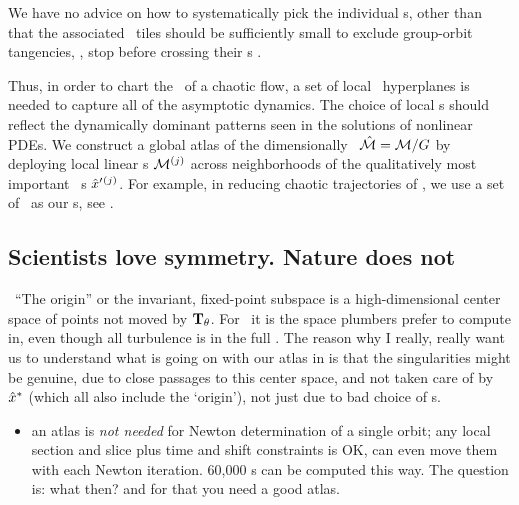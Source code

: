 We have no advice on how to
systematically pick the individual \template s, other than that the
associated \slice\ tiles should be sufficiently small to exclude
group-orbit tangencies, \ie, stop before crossing their {\chartBord}s .

Thus, in order to chart the \statesp\ of a chaotic flow, a set
of local \slice\ hyperplanes is needed to capture all of the asymptotic
dynamics. The choice of local \slice s should reflect the dynamically
dominant patterns seen in the solutions of nonlinear PDEs. We construct a
global atlas of the dimensionally \reducedsp\ $\hat{\cal M} = {\cal M}/G$ by
deploying local linear \slice s  ${\cal M}{}^{(j)}$ across neighborhoods of
the qualitatively most important \template\ {\cohStr s}
${\hat{x}'}{}^{(j)}$. For example, in reducing chaotic trajectories of
, we use a set of \reqva\ as our \template s, see
.

    \ifdraft\color{blue}
\subsection{Scientists love symmetry. Nature does not}\
``The origin'' or the invariant, fixed-point subspace is a
high-dimensional center space of points not moved by $\mathbf{T}_{\theta}$. For
\pCf\ it is the space plumbers prefer to compute in, even though all
turbulence is in the full \statesp. The reason why I really, really want
us to understand what is going on with our atlas in 
is that the singularities might be genuine, due to close passages to this
center space, and not taken care of by $\hat{x}^\ast$ (which all also
include the `origin'), not just due to bad choice of \template s.
    \color{black}\fi

    \begin{itemize}
      \item an atlas is \emph{not needed} for Newton determination of a
            single orbit; any local section and slice plus time and shift
            constraints is OK, can even move them with each Newton
            iteration. 60,000 \rpo s can be computed\rf{SCD07} this way.
            The question is: what then? and for that you need a good atlas.
    \end{itemize}
